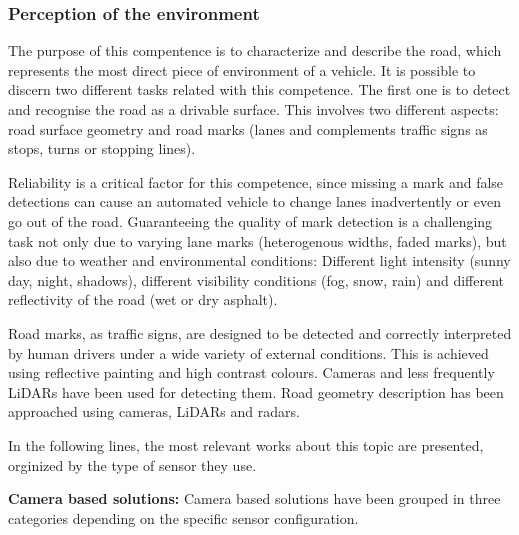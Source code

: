 \subsubsection{Perception of the environment}
The purpose of this compentence is to characterize and describe the road, which
represents the most direct piece of environment of a vehicle. 
It is possible to discern two different tasks related with this competence.
The first one is to detect and recognise the road as a drivable surface. This 
involves two different aspects: road surface geometry and road marks (lanes
and complements traffic signs as stops, turns or stopping lines).


Reliability is a critical factor for this competence, since missing a mark and
false detections can cause an automated vehicle to change lanes inadvertently 
or even go out of the road. Guaranteeing the quality of mark detection is a 
challenging task not only due to varying lane marks (heterogenous widths, 
faded marks), but also due to weather and environmental conditions: 
Different light intensity (sunny day, night, shadows), different 
visibility conditions (fog, snow, rain) and different reflectivity of the road
(wet or dry asphalt). 

Road marks, as traffic signs, are designed to be detected and 
correctly interpreted by human drivers under a wide variety of external 
conditions. This is achieved using reflective painting and high contrast 
colours. Cameras and less frequently LiDARs have been used for detecting them.
Road geometry description has been approached using cameras, LiDARs and radars.

In the following lines, the most relevant works about this topic are presented, orginized by the type of sensor they use.


\textbf{Camera based solutions:}
Camera based solutions have been grouped in three categories depending on the
specific sensor configuration.

